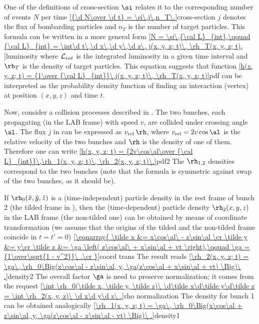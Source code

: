 One of the definitions of cross-section $\si$ relates it to the corresponding number of events $N$ per time
\eqref{{\d N\over \d t} = \si\,j\,n_T\.}{cross-section}
$j$ denotes the flux of bombarding particles and $n_T$ is the number of target particles. This formula can be written in a more general form
\eqref{N = \si\,{\cal L}_{int},\qquad {\cal L}_{int} = \int\d t\,\d x\,\d y\,\d z\, j(x, y, z; t)\, \rh_T(x, y, z; t), }{luminosity}
where ${\cal L}_{int}$ is the integrated luminosity in a given time interval and $\rh_T$ is the density of target particles. This equation suggests that function
\eqref{h(x, y, z; t) = {1\over {\cal L}_{int}}\,j(x, y, z; t)\, \rh_T(x, y, z; t)}{pdf}
can be interpreted as the probability density function of finding an interaction (vertex) at position $(x, y, z)$ and time $t$.


Now, consider a collision processes described in . The two bunches, each propagating (in the LAB frame) with speed $v$, are collided under crossing angle $\al$. The flux $j$ in  can be expressed as $v_{\rm rel}\,\rh$, where $v_{\rm rel} = 2v\cos\al$ is the relative velocity of the two bunches and $\rh$ is the density of one of them. Therefore one can write
\eqref{h(x, y, z; t) = {2v\cos\al\over {\cal L}_{int}}\,\rh_1(x, y, z; t)\, \rh_2(x, y, z; t)\.}{pdf2}
The $\rh_{1,2}$ densities correspond to the two bunches (note that the formula is symmetric against swap of the two bunches, as it should be).

If $\rh_0(\tilde x, \tilde y, \tilde z)$ is a (time-independent) particle density in the rest frame of bunch 2 (the tilded frame in ), then the (time-dependent) particle density $\rh_2(x, y, z)$ in the LAB frame (the non-tilded one) can be obtained by means of coordinate transformation (we assume that the origins of the tilded and the non-tilded frame coincide in $t=t'=0$)
\eqref{\eqnarray{
\tilde x &= x\cos\al\ - z\sin\al \cr
\tilde y &= y\cr
\tilde z &= \ga \left( z\cos\al\ + x\sin\al + vt \right),\qquad \ga = {1\over\sqrt{1 - v^2}}\ .\cr
}}{coord trans}
The result reads
\eqref{\rh_2(x, y, z; t) = \ga\, \rh_0\Big(x\cos\al - z\sin\al, y, \ga(z\cos\al + x\sin\al + vt) \Big)\ .}{density2}
The overall factor $\ga$ is need to preserve normalization; it comes from the request
\eqref{\int \rh_0(\tilde x, \tilde y, \tilde z)\ \d\tilde x\d\tilde y\d\tilde z = \int \rh_2(x, y, z)\ \d x\d y\d z\ .}{rho normalization}
The density for bunch 1 can be obtained analogically
\eqref{\rh_1(x, y, z; t) = \ga\, \rh_0\Big(x\cos\al + z\sin\al, y, \ga(z\cos\al - x\sin\al - vt) \Big)\ .}{density1}

